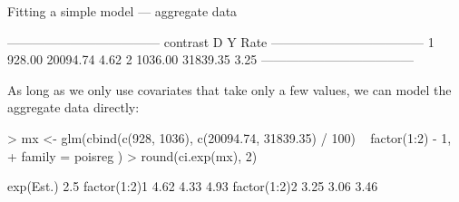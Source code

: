 \begin{frame}[fragile]{Fitting a simple model --- aggregate data}
\begin{Schunk}
\begin{Soutput}
 ------------------------------------ 
 contrast         D        Y    Rate  
 ------------------------------------ 
 1           928.00 20094.74    4.62  
 2          1036.00 31839.35    3.25  
 ------------------------------------ 
\end{Soutput}
\end{Schunk}
\vspace*{-1em}
\small
As long as we only use covariates that take only a few values, we can
model the aggregate data directly:
\begin{Schunk}
\begin{Sinput}
> mx <- glm(cbind(c(928, 1036), c(20094.74, 31839.35) / 100) ~ factor(1:2) - 1,
+           family = poisreg )
> round(ci.exp(mx), 2)
\end{Sinput}
\begin{Soutput}
             exp(Est.) 2.5%
factor(1:2)1      4.62 4.33  4.93
factor(1:2)2      3.25 3.06  3.46
\end{Soutput}
\end{Schunk}
\end{frame}
